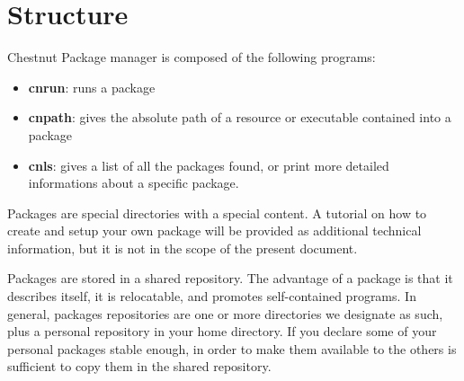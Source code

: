 \section{Structure}

Chestnut Package manager is composed of the following programs:
\begin{itemize}
\item \textbf{cnrun}: runs a package
\item \textbf{cnpath}: gives the absolute path of a resource or executable contained into a
package
\item \textbf{cnls}: gives a list of all the packages found, or print
more detailed informations about a specific package.
\end{itemize}

Packages are special directories with a special content. A tutorial on how
to create and setup your own package will be provided as additional technical
information, but it is not in the scope of the present document.

Packages are stored in a shared repository. The advantage of a package is
that it describes itself, it is relocatable, and promotes self-contained
programs. In general, packages repositories are one or more directories we
designate as such, plus a personal repository in your home directory. If you
declare some of your personal packages stable enough, in order to make them
available to the others is sufficient to copy them in the shared repository.
